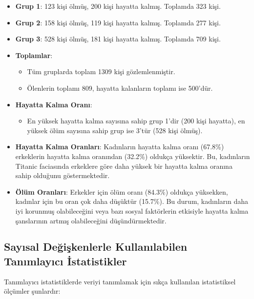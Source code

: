 \documentclass[
  letterpaper,
  DIV=11,
  numbers=noendperiod]{scrartcl}
\providecommand{\tightlist}{%
  \setlength{\itemsep}{0pt}\setlength{\parskip}{0pt}}\usepackage{longtable,booktabs,array}
\begin{document}
\begin{itemize}
\item
  \textbf{Grup 1}: 123 kişi ölmüş, 200 kişi hayatta kalmış. Toplamda 323
  kişi.
\item
  \textbf{Grup 2}: 158 kişi ölmüş, 119 kişi hayatta kalmış. Toplamda 277
  kişi.
\item
  \textbf{Grup 3}: 528 kişi ölmüş, 181 kişi hayatta kalmış. Toplamda 709
  kişi.
\item
  \textbf{Toplamlar}:

  \begin{itemize}
  \item
    Tüm gruplarda toplam 1309 kişi gözlemlenmiştir.
  \item
    Ölenlerin toplamı 809, hayatta kalanların toplamı ise 500'dür.
  \end{itemize}
\item
  \textbf{Hayatta Kalma Oranı}:

  \begin{itemize}
  \tightlist
  \item
    En yüksek hayatta kalma sayısına sahip grup 1'dir (200 kişi
    hayatta), en yüksek ölüm sayısına sahip grup ise 3'tür (528 kişi
    ölmüş).
  \end{itemize}
\item
  \textbf{Hayatta Kalma Oranları}: Kadınların hayatta kalma oranı
  (67.8\%) erkeklerin hayatta kalma oranından (32.2\%) oldukça
  yüksektir. Bu, kadınların Titanic faciasında erkeklere göre daha
  yüksek bir hayatta kalma oranına sahip olduğunu göstermektedir.
\item
  \textbf{Ölüm Oranları}: Erkekler için ölüm oranı (84.3\%) oldukça
  yüksekken, kadınlar için bu oran çok daha düşüktür (15.7\%). Bu durum,
  kadınların daha iyi korunmuş olabileceğini veya bazı sosyal
  faktörlerin etkisiyle hayatta kalma şanslarının artmış olabileceğini
  düşündürmektedir.
\end{itemize}

\hypertarget{sayux131sal-deux11fiux15fkenlerle-kullanux131labilen-tanux131mlayux131cux131-istatistikler}{%
\subsection{Sayısal Değişkenlerle Kullanılabilen Tanımlayıcı
İstatistikler}\label{sayux131sal-deux11fiux15fkenlerle-kullanux131labilen-tanux131mlayux131cux131-istatistikler}}

Tanımlayıcı istatistiklerde veriyi tanımlamak için sıkça kullanılan
istatistiksel ölçümler şunlardır:
\end{document}

